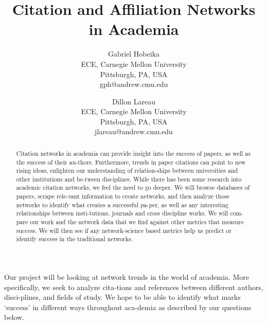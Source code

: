 \documentclass[times, 10pt,twocolumn]{article}
\begin{document}
\title{Citation and Affiliation Networks in Academia }

\author{Gabriel Hobeika\\
ECE, Carnegie Mellon University\\ Pittsburgh, PA, USA\\
gph@andrew.cmu.edu\\
\and
Dillon Lareau\\
ECE, Carnegie Mellon University\\ Pittsburgh, PA, USA\\
jlareau@andrew.cmu.edu\\
}

\maketitle
\thispagestyle{empty}

\begin{abstract}
Citation networks in academia can provide insight into the success of papers, as well as the success of their au-thors. Furthermore, trends in paper citations can point to new rising ideas, enlighten our understanding of relation-ships between universities and other institutions and be-tween disciplines. While there has been some research into academic citation networks, we feel the need to go deeper. We will browse databases of papers, scrape rele-vant information to create networks, and then analyze those networks to identify what creates a successful pa-per, as well as any interesting relationships between insti-tutions, journals and cross discipline works. We will com-pare our work and the network data that we find against other metrics that measure success. We will then see if any network-science based metrics help us predict or identify success in the traditional networks. 
\end{abstract}


Our project will be looking at network trends in the world of academia. More specifically, we seek to analyze cita-tions and references between different authors, disci-plines, and fields of study. We hope to be able to identify what marks ‘success’ in different ways throughout aca-demia as described by our questions below.
\end{document}
